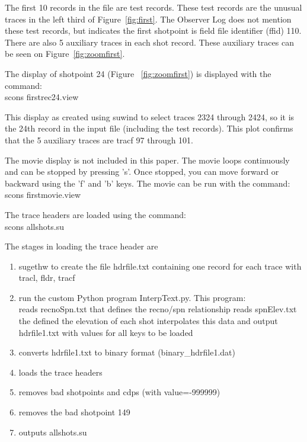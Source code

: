 The first 10 records in the file are test records.  These test
records are the unusual traces in the left third of
Figure~\ref{fig:first}. The Observer Log does not mention these test
records, but indicates the first shotpoint is field file identifier 
(ffid) 110.  There are also 5 auxiliary traces in each shot record.  
These auxiliary traces can be seen on Figure~\ref{fig:zoomfirst}. 

The display of shotpoint 24 (Figure ~\ref{fig:zoomfirst}) is displayed 
with the command: \\
scons firstrec24.view

This display as created using suwind to select traces 2324 through 2424, 
so it is the 24th record in the input file (including the test records). 
This plot confirms that the 5 auxiliary traces are tracf 97 through 101.


The movie display is not included in this paper.  The movie loops 
continuously and can be stopped by pressing 's'.  Once stopped, you 
can move forward or backward using the 'f' and 'b' keys.  The movie can be 
run with the command:\\
scons firstmovie.view


The trace headers are loaded using the command:\\
scons allshots.su

The stages in loading the trace header are
\begin{enumerate}
\item sugethw to create the file hdrfile.txt containing one record for 
each trace with tracl, fldr, tracf
\item run the custom Python program InterpText.py.  This program:\\
reads recnoSpn.txt that defines the recno/spn relationship
reads spnElev.txt  the defined the elevation of each shot
interpolates this data and output hdrfile1.txt with values for all keys
to be loaded
\item converts hdrfile1.txt to binary format (binary\_hdrfile1.dat)
\item loads the trace headers
\item removes bad shotpoints and cdps (with value=-999999)
\item removes the bad shotpoint 149
\item outputs allshots.su
\end{enumerate}

